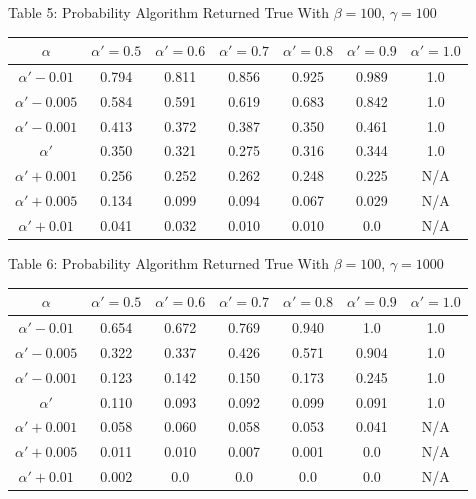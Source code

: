 \documentclass{article}
\begin{document}
\begin{center}
Table 5: Probability Algorithm Returned True With $\beta=100$, $\gamma=100$ \\
\begin{tabular}{|c|c|c|c|c|c|c|}
\hline
$\alpha$ & $\alpha' = 0.5$ & $\alpha' = 0.6$ & $\alpha' = 0.7$ & $\alpha' = 0.8$ & $\alpha' = 0.9$ & $\alpha' = 1.0$ \\
\hline
$\alpha' -0.01$ & 0.794 & 0.811 & 0.856 & 0.925 & 0.989 & 1.0 \\
\hline
$\alpha'-0.005$ & 0.584 & 0.591 & 0.619 & 0.683 & 0.842 & 1.0 \\
\hline
$\alpha'-0.001$ & 0.413 & 0.372 & 0.387 & 0.350 & 0.461 & 1.0 \\
\hline
$\alpha'$            & 0.350 & 0.321 & 0.275 & 0.316 & 0.344 & 1.0 \\
\hline
$\alpha'+0.001$ & 0.256 & 0.252 & 0.262 & 0.248 & 0.225 & N/A \\
\hline
$\alpha'+0.005$ & 0.134 & 0.099 & 0.094 & 0.067 & 0.029 & N/A \\
\hline
$\alpha'+0.01 $ & 0.041 & 0.032 & 0.010 & 0.010 & 0.0 & N/A \\
\hline
\end{tabular}
\end{center}

\begin{center}
Table 6: Probability Algorithm Returned True With $\beta=100$, $\gamma=1000$ \\
\begin{tabular}{|c|c|c|c|c|c|c|}
\hline
$\alpha$ & $\alpha' = 0.5$ & $\alpha' = 0.6$ & $\alpha' = 0.7$ & $\alpha' = 0.8$ & $\alpha' = 0.9$ & $\alpha' = 1.0$ \\
\hline
$\alpha' -0.01$ & 0.654 & 0.672 & 0.769 & 0.940 & 1.0 & 1.0 \\
\hline
$\alpha'-0.005$ & 0.322 & 0.337 & 0.426 & 0.571 & 0.904 & 1.0 \\
\hline
$\alpha'-0.001$ & 0.123 & 0.142 & 0.150 & 0.173 & 0.245 & 1.0 \\
\hline
$\alpha'$            & 0.110 & 0.093 & 0.092 & 0.099 & 0.091 & 1.0 \\
\hline
$\alpha'+0.001$ & 0.058 & 0.060 & 0.058 & 0.053 & 0.041 & N/A \\
\hline
$\alpha'+0.005$ & 0.011 & 0.010 & 0.007 & 0.001 & 0.0 & N/A \\
\hline
$\alpha'+0.01 $ & 0.002 & 0.0 & 0.0 & 0.0 & 0.0 & N/A \\
\hline
\end{tabular}
\end{center}
\end{document}
